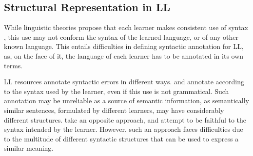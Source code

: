 \documentclass[letter,11pt]{article}
\begin{document}
%
%
%
\subsection{Structural Representation in LL}
%
While linguistic theories propose that each learner makes consistent use of syntax \cite{huebner1985system,tarone1983variability}, this use may not conform the syntax of the learned language, or of any other known language. This entails difficulties in defining syntactic annotation for LL, as, on the face of it, the language of each learner has to be annotated in its own terms.

LL resources annotate syntactic errors in different ways.
 and 
annotate according to the syntax used
by the learner, even if this use is not grammatical.
Such annotation may be unreliable as a source of semantic information, as semantically similar sentences, formulated by different learners, may have considerably different structures.  take an opposite approach, and attempt
to be faithful to the syntax intended by the learner. However, such an approach faces difficulties due to the multitude of different syntactic structures that can be used to express a similar meaning.
%
\end{document}
